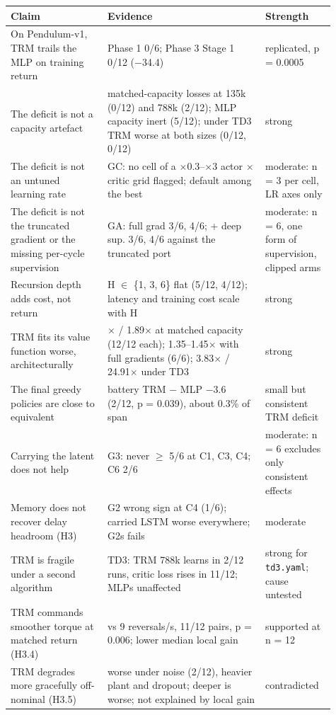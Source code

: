 \documentclass[11pt]{article}
\begin{document}
\begin{center}\small\begin{tabular}{>{\raggedright\arraybackslash}p{0.271\linewidth}>{\raggedright\arraybackslash}p{0.448\linewidth}>{\raggedright\arraybackslash}p{0.187\linewidth}}
\toprule
Claim & Evidence & Strength \\
\midrule
On Pendulum-v1, TRM trails the MLP on training return & Phase 1 0/6; Phase 3 Stage 1 0/12 ($-$34.4) & replicated, p = 0.0005 \\
The deficit is not a capacity artefact & matched-capacity losses at 135k (0/12) and 788k (2/12); MLP capacity inert (5/12); under TD3 TRM worse at both sizes (0/12, 0/12) & strong \\
The deficit is not an untuned learning rate & GC: no cell of a $\times$0.3--$\times$3 actor $\times$ critic grid flagged; default among the best & moderate: n = 3 per cell, LR axes only \\
The deficit is not the truncated gradient or the missing per-cycle supervision & GA: full grad 3/6, 4/6; + deep sup. 3/6, 4/6 against the truncated port & moderate: n = 6, one form of supervision, clipped arms \\
Recursion depth adds cost, not return & H $\in$ \{1, 3, 6\} flat (5/12, 4/12); latency and training cost scale with H & strong \\
TRM fits its value function worse, architecturally & 1.45$\times$ / 1.89$\times$ at matched capacity (12/12 each); 1.35--1.45$\times$ with full gradients (6/6); 3.83$\times$ / 24.91$\times$ under TD3 & strong \\
The final greedy policies are close to equivalent & battery TRM $-$ MLP $-$3.6 (2/12, p = 0.039), about 0.3\% of span & small but consistent TRM deficit \\
Carrying the latent does not help & G3: never $\geq$ 5/6 at C1, C3, C4; C6 2/6 & moderate: n = 6 excludes only consistent effects \\
Memory does not recover delay headroom (H3) & G2 wrong sign at C4 (1/6); carried LSTM worse everywhere; G2s fails & moderate \\
TRM is fragile under a second algorithm & TD3: TRM 788k learns in 2/12 runs, critic loss rises in 11/12; MLPs unaffected & strong for \texttt{td3.yaml}; cause untested \\
TRM commands smoother torque at matched return (H3.4) & 0.4 vs 9 reversals/s, 11/12 pairs, p = 0.006; lower median local gain & supported at n = 12 \\
TRM degrades more gracefully off-nominal (H3.5) & worse under noise (2/12), heavier plant and dropout; deeper is worse; not explained by local gain & contradicted \\

\end{tabular}
\end{center}
\end{document}
